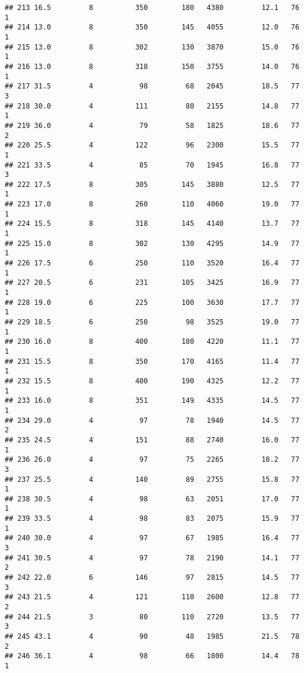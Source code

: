 \documentclass[
]{article}
\begin{document}
\begin{verbatim}
## 213 16.5         8          350        180   4380         12.1   76      1
## 214 13.0         8          350        145   4055         12.0   76      1
## 215 13.0         8          302        130   3870         15.0   76      1
## 216 13.0         8          318        150   3755         14.0   76      1
## 217 31.5         4           98         68   2045         18.5   77      3
## 218 30.0         4          111         80   2155         14.8   77      1
## 219 36.0         4           79         58   1825         18.6   77      2
## 220 25.5         4          122         96   2300         15.5   77      1
## 221 33.5         4           85         70   1945         16.8   77      3
## 222 17.5         8          305        145   3880         12.5   77      1
## 223 17.0         8          260        110   4060         19.0   77      1
## 224 15.5         8          318        145   4140         13.7   77      1
## 225 15.0         8          302        130   4295         14.9   77      1
## 226 17.5         6          250        110   3520         16.4   77      1
## 227 20.5         6          231        105   3425         16.9   77      1
## 228 19.0         6          225        100   3630         17.7   77      1
## 229 18.5         6          250         98   3525         19.0   77      1
## 230 16.0         8          400        180   4220         11.1   77      1
## 231 15.5         8          350        170   4165         11.4   77      1
## 232 15.5         8          400        190   4325         12.2   77      1
## 233 16.0         8          351        149   4335         14.5   77      1
## 234 29.0         4           97         78   1940         14.5   77      2
## 235 24.5         4          151         88   2740         16.0   77      1
## 236 26.0         4           97         75   2265         18.2   77      3
## 237 25.5         4          140         89   2755         15.8   77      1
## 238 30.5         4           98         63   2051         17.0   77      1
## 239 33.5         4           98         83   2075         15.9   77      1
## 240 30.0         4           97         67   1985         16.4   77      3
## 241 30.5         4           97         78   2190         14.1   77      2
## 242 22.0         6          146         97   2815         14.5   77      3
## 243 21.5         4          121        110   2600         12.8   77      2
## 244 21.5         3           80        110   2720         13.5   77      3
## 245 43.1         4           90         48   1985         21.5   78      2
## 246 36.1         4           98         66   1800         14.4   78      1

\end{verbatim}
\end{document}

